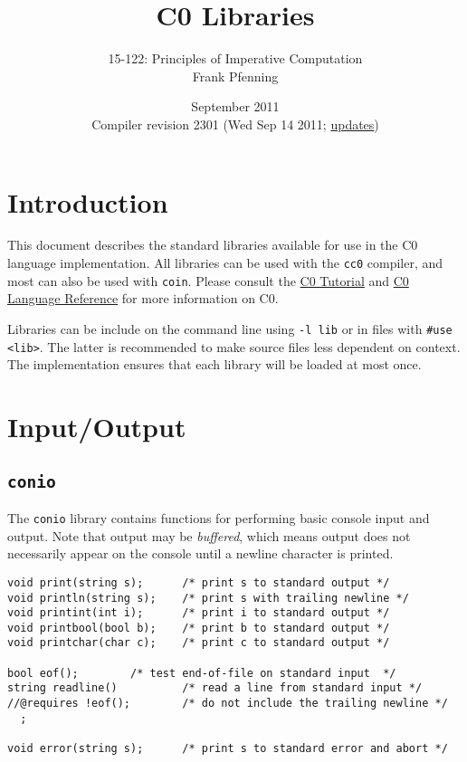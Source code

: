 \documentclass[11pt]{article}
\title{C0 Libraries}
\author{15-122: Principles of Imperative Computation \\ Frank Pfenning}
\date{September 2011\\Compiler revision 2301 (Wed Sep 14 2011;
  \hyperlink{sec:updates}{updates})}
\begin{document}
\maketitle

\section{Introduction}

This document describes the standard libraries available for use
in the C0 language implementation.  All libraries can be used
with the \verb'cc0' compiler, and most can also be used with
\verb'coin'.   Please consult the
\href{http://c0.typesafety.net/tutorial}{C0 Tutorial} and
\href{http://c0.typesafety.net/doc/c0-reference.pdf}{C0 Language
Reference} for more information on C0.

Libraries can be include on the command line using \verb'-l lib' or in
files with \verb'#use <lib>'.  The latter is recommended to make
source files less dependent on context.  The implementation ensures
that each library will be loaded at most once.

\section{Input/Output}

\subsection{\tt conio}

The \verb'conio' library contains functions for performing basic
console input and output.  Note that output may be \emph{buffered},
which means output does not necessarily appear on the console
until a newline character is printed.

\begin{small}
\begin{verbatim}
void print(string s);      /* print s to standard output */
void println(string s);    /* print s with trailing newline */
void printint(int i);      /* print i to standard output */
void printbool(bool b);    /* print b to standard output */
void printchar(char c);    /* print c to standard output */

bool eof();		   /* test end-of-file on standard input  */
string readline()          /* read a line from standard input */
//@requires !eof();        /* do not include the trailing newline */
  ;

void error(string s);      /* print s to standard error and abort */
\end{verbatim}
\end{small}
\end{document}
